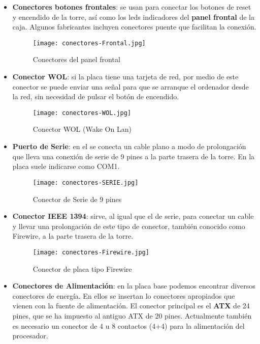 \begin{itemize}
\begin{itemize}
    \item \textbf{Conectores botones frontales}: se usan para conectar los botones de reset y encendido de la torre, así como los leds indicadores del \textbf{panel frontal} de la caja. Algunos fabricantes incluyen conectores puente que facilitan la conexión.

    \begin{figure}[H]
        \centering
        \texttt{[image: conectores-Frontal.jpg]}
        \caption{Conectores del panel frontal}
    \end{figure}

    \item \textbf{Conector WOL}: si la placa tiene una tarjeta de red, por medio de este conector se puede enviar una señal para que se arranque el ordenador desde la red, sin necesidad de pulsar el botón de encendido.

     \begin{figure}[H]
        \centering
        \texttt{[image: conectores-WOL.jpg]}
        \caption{Conector WOL (Wake On Lan)}
    \end{figure}

    \item \textbf{Puerto de Serie}: en el se conecta un cable plano a modo de prolongación que lleva una conexión de serie de 9 pines a la parte trasera de la torre. En la placa suele indicarse como COM1.

     \begin{figure}[H]
        \centering
        \texttt{[image: conectores-SERIE.jpg]}
        \caption{Conector de Serie de 9 pines}
    \end{figure}

    \item \textbf{Conector IEEE 1394}: sirve, al igual que el de serie, para conectar un cable y llevar una prolongación de este tipo de conector, también conocido como Firewire, a la parte trasera de la torre.

    \begin{figure}[H]
        \centering
        \texttt{[image: conectores-Firewire.jpg]}
        \caption{Conector de placa tipo Firewire}
    \end{figure}

    \item \textbf{Conectores de Alimentación}: en la placa base podemos encontrar diversos conectores de energía. En ellos se insertan lo conectores apropiados que vienen con la fuente de alimentación. El conector principal es el \textbf{ATX} de 24 pines, que se ha impuesto al antiguo ATX de 20 pines. Actualmente también es necesario un conector de 4 u 8 contactos (4+4) para la alimentación del procesador.


\end{itemize}
\end{itemize}
